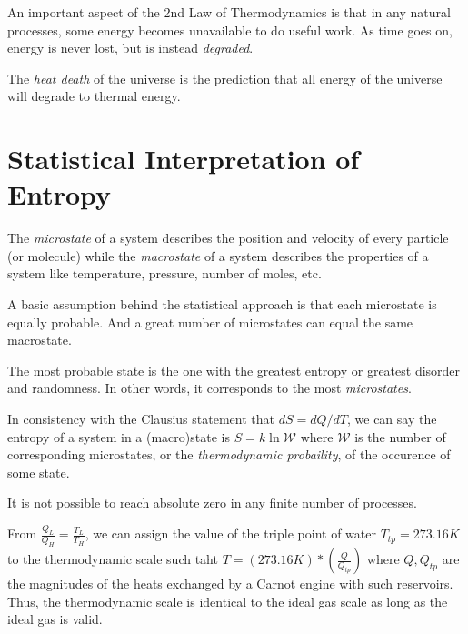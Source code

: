 \begin{remark}
    An important aspect of the 2nd Law of Thermodynamics is that in any natural processes, some energy becomes unavailable to do useful work. As time goes on, energy is never lost, but is instead \emph{degraded}.
\end{remark}
\begin{definition}
    The \emph{heat death} of the universe is the prediction that all energy of the universe will degrade to thermal energy. 
\end{definition}

\section{Statistical Interpretation of Entropy}

\begin{definition}
    The \emph{microstate} of a system describes the position and velocity of every particle (or molecule) while the \emph{macrostate} of a system describes the properties of a system like temperature, pressure, number of moles, etc.
\end{definition}
\begin{remark}
    A basic assumption behind the statistical approach is that each microstate is equally probable. And a great number of microstates can equal the same macrostate.
\end{remark}
\begin{remark}
    The most probable state is the one with the greatest entropy or greatest disorder and randomness. In other words, it corresponds to the most \emph{microstates}.
\end{remark}
\begin{definition}
    In consistency with the Clausius statement that $dS = dQ/dT$, we can say the entropy of a system in a (macro)state is $S = k\ln{\mathscr{W}}$ where $\mathscr{W}$ is the number of corresponding microstates, or the \emph{thermodynamic probaility}, of the occurence of some state.
\end{definition}
\begin{definition}
    It is not possible to reach absolute zero in any finite number of processes.
\end{definition}
\begin{remark}
    From $\frac{Q_L}{Q_H} = \frac{T_L}{T_H}$, we can assign the value of the triple point of water $T_{tp} = 273.16 K$ to the thermodynamic scale such taht $T = (273.16K) * (\frac{Q}{Q_{tp}})$ where $Q, Q_{tp}$ are the magnitudes of the heats exchanged by a Carnot engine with such reservoirs. Thus, the thermodynamic scale is identical to the ideal gas scale as long as the ideal gas is valid.
\end{remark}
